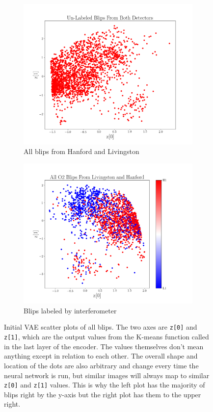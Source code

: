 \documentclass[a4paper]{article}
\begin{document}
\begin{figure}[h!]
	\centering
	\begin{subfigure}{.49\textwidth}
		\centering
		\includegraphics[width=1\linewidth]{vae_unlabeled}
		\caption{All blips from Hanford and Livingston}
		\label{fig:vae_unlabeled}
	\end{subfigure}
	\begin{subfigure}{.49\textwidth}
		\centering
		\includegraphics[width=1\linewidth]{vae_ifo_unlabeled}
		\caption{Blips labeled by interferometer}
		\label{fig:vae_ifo_unlabeled}
	\end{subfigure}
	\caption{Initial VAE scatter plots of all blips. The two axes are \texttt{z[0]} and \texttt{z[1]}, which are the output values from the K-means function called in the last layer of the encoder. The values themselves don't mean anything except in relation to each other. The overall shape and location of the dots are also arbitrary and change every time the neural network is run, but similar images will always map to similar \texttt{z[0]} and \texttt{z[1]} values. This is why the left plot has the majority of blips right by the y-axis but the right plot has them to the upper right.}
	\label{fig:unlabeled}
\end{figure}
\end{document}
